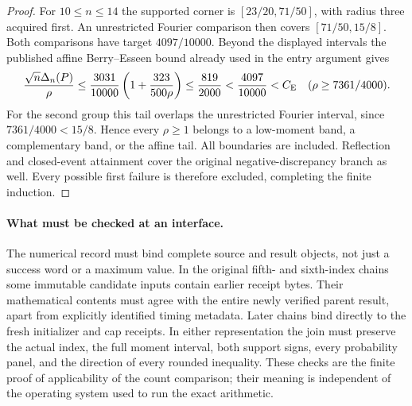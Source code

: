 \begin{proof}
For $10\le n\le14$ the supported corner is
$[23/20,71/50]$, with radius three acquired first. An unrestricted
Fourier comparison then covers $[71/50,15/8]$. Both comparisons
have target $4097/10000$.
Beyond the displayed intervals the published affine Berry--Esseen
bound already used in the entry argument gives
\[
 \frac{\sqrt n\Delta_n(P)}{\rho}
 \le\frac{3031}{10000}\left(1+\frac{323}{500\rho}\right)
 \le\frac{819}{2000}<\frac{4097}{10000}<C_{\mathrm E}
 \quad(\rho\ge7361/4000).
\]
For the second group this tail overlaps the unrestricted Fourier
interval, since $7361/4000<15/8$. Hence every $\rho\ge1$ belongs
to a low-moment band, a complementary band, or the affine tail.
All boundaries are included. Reflection and closed-event attainment
cover the original negative-discrepancy branch as well. Every possible
first failure is therefore excluded, completing the finite induction.
\end{proof}

\paragraph{What must be checked at an interface.}
The numerical record must bind complete source and result objects, not
just a success word or a maximum value. In the original fifth- and
sixth-index chains some immutable candidate inputs contain earlier
receipt bytes. Their mathematical contents must agree with the entire
newly verified parent result, apart from explicitly identified timing
metadata. Later chains bind directly to the fresh initializer and cap
receipts. In either representation the join must preserve the actual
index, the full moment interval, both support signs, every probability
panel, and the direction of every rounded inequality. These checks are
the finite proof of applicability of the count comparison; their
meaning is independent of the operating system used to run the exact
arithmetic.
